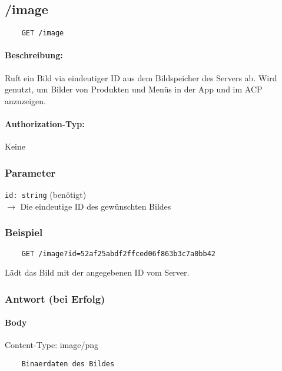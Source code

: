 \subsection{/image}

\begin{lstlisting}
    GET /image
\end{lstlisting}

\paragraph{Beschreibung:} Ruft ein Bild via eindeutiger ID aus dem Bildspeicher des Servers ab. Wird genutzt, um Bilder von Produkten und Menüs in der App und im ACP anzuzeigen.

\paragraph{Authorization-Typ:}
Keine

\subsubsection{Parameter}

\lstinline{id: string} (benötigt) \\
$\rightarrow$ Die eindeutige ID des gewünschten Bildes

\subsubsection{Beispiel}

\begin{lstlisting}
    GET /image?id=52af25abdf2ffced06f863b3c7a0bb42
\end{lstlisting}

Lädt das Bild mit der angegebenen ID vom Server.

\subsubsection{Antwort (bei Erfolg)}

\paragraph{Body}
Content-Type: image/png
\begin{lstlisting}
    Binaerdaten des Bildes
\end{lstlisting}